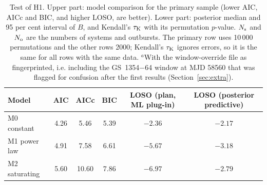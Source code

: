 \documentclass[fleqn,usenatbib]{mnras}
\begin{document}
\begin{table}
\centering
\caption{Test of H1. Upper part: model comparison for the primary sample (lower AIC, AICc and BIC, and higher LOSO, are better). Lower part: posterior median and 95 per cent interval of $B$, and Kendall's $\tau_{\rm K}$ with its permutation $p$-value. $N_{\rm s}$ and $N_{\rm o}$ are the numbers of systems and outbursts. The primary row uses 10\,000 permutations and the other rows 2000; Kendall's $\tau_{\rm K}$ ignores errors, so it is the same for all rows with the same data. $^{a}$With the window-override file as fingerprinted, i.e. including the GS~1354$-$64 window at MJD 58560 that was flagged for confusion after the first results (Section~\ref{sec:extra}).}
\label{tab:h1}
\begin{tabular}{lccccc}
\toprule
Model & AIC & AICc & BIC & LOSO (plan, ML plug-in) & LOSO (posterior predictive) \\
\midrule
M0 constant & 4.26 & 5.46 & 5.39 & $-2.36$ & $-2.17$ \\
M1 power law & 4.91 & 7.58 & 6.61 & $-5.67$ & $-3.18$ \\
M2 saturating & 5.60 & 10.60 & 7.86 & $-6.97$ & $-2.79$ \\
\bottomrule
\end{tabular}


\end{table}
\end{document}
